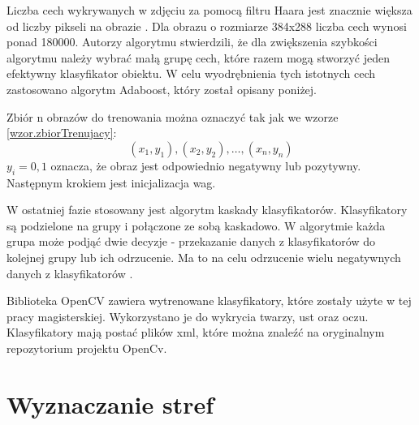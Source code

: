 \documentclass[a4paper,twoside,12pt]{book}
\begin{document}
    Liczba cech wykrywanych w zdjęciu za
    pomocą filtru Haara jest znacznie większa od liczby pikseli na obrazie \cite{violaJones}.
    Dla obrazu o rozmiarze 384x288 liczba cech wynosi ponad 180000.
    Autorzy algorytmu stwierdzili, że dla zwiększenia szybkości algorytmu należy wybrać małą grupę cech,
    które razem mogą stworzyć jeden efektywny klasyfikator obiektu.
    W celu wyodrębnienia tych istotnych cech zastosowano algorytm Adaboost, który został opisany poniżej.

    Zbiór n obrazów do trenowania można oznaczyć tak jak we wzorze \ref{wzor.zbiorTrenujacy}:
    \large
    \begin{equation}
        (x_1, y_1), (x_2, y_2), \ldots, (x_n, y_n)
        \label{wzor.zbiorTrenujacy}
    \end{equation}
    \normalsize
    \begin{math}
        y_i = 0, 1
    \end{math}
    oznacza, że obraz jest odpowiednio negatywny lub pozytywny.
    Następnym krokiem jest inicjalizacja wag.


    W ostatniej fazie stosowany jest algorytm kaskady klasyfikatorów.
    Klasyfikatory są podzielone na grupy i
    połączone ze sobą kaskadowo.
    W algorytmie każda grupa może podjąć dwie decyzje - przekazanie danych z klasyfikatorów
    do kolejnej grupy lub ich odrzucenie.
    Ma to na celu odrzucenie wielu negatywnych danych z klasyfikatorów \cite{cascade}.

    Biblioteka OpenCV zawiera wytrenowane klasyfikatory, które zostały użyte w tej pracy magisterskiej.
    Wykorzystano
    je do wykrycia twarzy, ust oraz oczu.
    Klasyfikatory mają postać plików xml, które można znaleźć na oryginalnym
    repozytorium projektu OpenCv.

    \section{Wyznaczanie stref}\label{sec:wyznaczanieStref}
\end{document}
